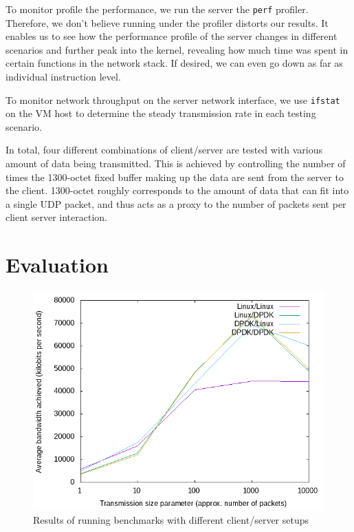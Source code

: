 \documentclass{sig-alternate-05-2015}
\begin{document}
To monitor profile the performance, we run the server the \texttt{perf} profiler.
Therefore, we don't believe running under the profiler distorts our results. It enables us to see how the performance profile of the server changes in different scenarios and further peak into the kernel,
revealing how much time was spent in certain functions in the network stack. If desired, we can even go down as far as individual instruction level.

To monitor network throughput on the server network interface, we use \texttt{ifstat} on the VM host to determine the steady transmission rate in each testing scenario.

In total, four different combinations of client/server are tested with various amount of data being transmitted. This is achieved by controlling the number of times the 1300-octet fixed buffer making up the data are sent from the server to the client. 1300-octet roughly corresponds to the amount of data that can fit into a single UDP packet, and thus acts as a proxy to the number of packets sent per client server interaction.

\section{Evaluation}

\begin{figure}[bh]
\centering
\includegraphics[scale=0.5]{plot.png}
\caption{Results of running benchmarks with different client/server setups}
\label{fig:benchmark}
\end{figure}
\end{document}
